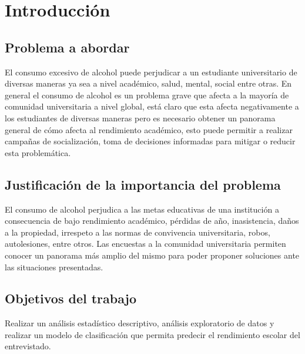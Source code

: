 \documentclass[a4paper,12pt]{article}
\begin{document}
\section{Introducción}

\subsection{Problema a abordar}
El consumo excesivo de alcohol puede perjudicar a un estudiante universitario de diversas maneras ya sea a nivel académico, salud, mental, social entre otras. En general el consumo de alcohol es un problema grave que afecta a la mayoría de comunidad universitaria a nivel global, está claro que esta afecta negativamente a los estudiantes de diversas maneras pero es necesario obtener un panorama general de cómo afecta al rendimiento académico, esto puede permitir a realizar campañas de socialización, toma de decisiones informadas para mitigar o reducir esta problemática.
\subsection{Justificación de la importancia del problema}
El consumo de alcohol perjudica a las metas educativas de una institución a consecuencia de bajo rendimiento académico, pérdidas de año, inasistencia, daños a la propiedad, irrespeto a las normas de convivencia universitaria, robos, autolesiones, entre otros. Las encuestas a la comunidad universitaria permiten conocer un panorama más amplio del mismo para poder proponer soluciones ante las situaciones presentadas.
\subsection{Objetivos del trabajo}
Realizar un análisis estadístico descriptivo, análisis exploratorio de datos y realizar un modelo de clasificación que permita predecir el rendimiento escolar del entrevistado.
\end{document}
